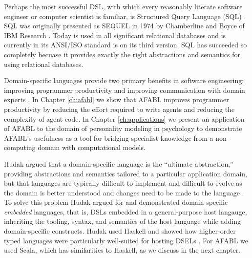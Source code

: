 Perhaps the most successful DSL, with which every reasonably literate software engineer or computer scientist is familiar, is Structured Query Language (SQL) \cite{}. SQL was originally presented as SEQUEL in 1974 by Chamberline and Boyce of IBM Research \cite{chamberlin1974sequel}. Today is used in all significant relational databases and is currently in its ANSI/ISO standard is on its third version. SQL has succeeded so completely becuase it provides exactly the right abstractions and semantics for using relational databases.

Domain-specific languages provide two primary benefits in software engineering: improving programmer productivity and improving communication with domain experts \cite{fowler2011domain}. In Chapter \ref{ch:afabl} we show that AFABL improves programmer productivity by reducing the effort required to write agents and reducing the complexity of agent code. In Chapter \ref{ch:applications} we present an application of AFABL to the domain of personality modeling in psychology to demonstrate AFABL's usefulness as a tool for bridging specialist knowledge from a non-computing domain with computational models.

Hudak argued that a domain-specific language is the ``ultimate abstraction,'' providing abstractions and semantics tailored to a particular application domain, but that languages are typically difficult to implement and difficult to evolve as the domain is better understood and changes need to be made to the language \cite{hudak1996building}. To solve this problem Hudak argued for and demonstrated domain-specific {\it embedded} languages, that is, DSLs embedded in a general-purpose host langauge, inheriting the tooling, syntax, and semantics of the host language while adding domain-specific constructs. Hudak used Haskell and showed how higher-order typed languages were particularly well-suited for hosting DSELs \cite{hudak1998modular}. For AFABL we used Scala, which has similarities to Haskell, as we discuss in the next chapter.

